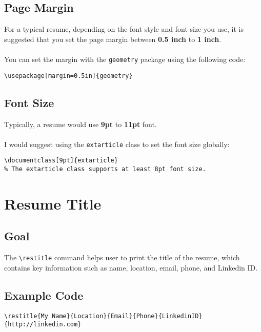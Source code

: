 \documentclass[a4paper,10pt]{article}
\begin{document}
\subsection{Page Margin}
For a typical resume, depending on the font style and font size you use, it is suggested that you set the page margin between {\bf 0.5 inch} to {\bf 1 inch}.\\
~\\
You can set the margin with the {\tt geometry} package using the following code:
\begin{lstlisting}
\usepackage[margin=0.5in]{geometry}
\end{lstlisting}

\vspace{1cm}

\subsection{Font Size}
Typically, a resume would use {\bf 9pt} to {\bf 11pt} font.\\
~\\
I would suggest using the {\tt extarticle} class to set the font size globally:

\begin{lstlisting}
\documentclass[9pt]{extarticle}
% The extarticle class supports at least 8pt font size.
\end{lstlisting}
\newpage

\section{Resume Title}

\subsection{Goal}
The \verb+\restitle+ command helps user to print the title of the resume, which contains key information such as name, location, email, phone, and Linkedin ID.\\

\subsection{Example Code}
\begin{lstlisting}
\restitle{My Name}{Location}{Email}{Phone}{LinkedinID}{http://linkedin.com}
\end{lstlisting}

\vspace{1cm}
\end{document}
